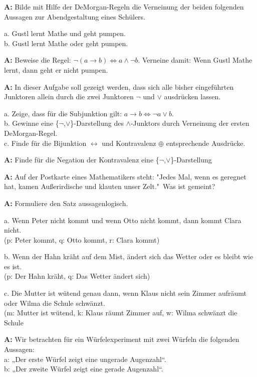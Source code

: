 \documentclass[landscape,twocolumn,a4paper]{article}
\begin{document}
\textbf{A:} 
Bilde mit Hilfe der DeMorgan-Regeln die Verneinung der beiden folgenden Aussagen zur Abendgestaltung eines Schülers. 

a. Gustl lernt Mathe und geht pumpen. \\
b. Gustl lernt Mathe oder geht pumpen.
\bigskip {}

\textbf{A:} 
Beweise die Regel: $\lnot (a \rightarrow b) \Leftrightarrow a \land \lnot b$. Verneine damit: Wenn Gustl Mathe lernt, dann geht er nicht pumpen.
\bigskip {}



\textbf{A:} 
In dieser Aufgabe soll gezeigt werden, dass sich alle bisher eingeführten Junktoren allein durch die zwei Junktoren
$\lnot$ und $\lor$ ausdrücken lassen.

a. Zeige, dass für die Subjunktion gilt: $a \rightarrow b \Leftrightarrow \lnot a \lor b$. \\
b. Gewinne eine  \{$\lnot$,$\lor$\}-Darstellung des $\land$-Junktors durch Verneinung der ersten DeMorgan-Regel. \\
c. Finde für die Bijunktion $\leftrightarrow$ und Kontravalenz $\oplus$ entsprechende Ausdrücke.
\bigskip {}

\textbf{A:} 
Finde für die Negation der Kontravalenz eine  \{$\lnot$,$\lor$\}-Darstellung
\bigskip {}

\textbf{A:} 
Auf der Postkarte eines Mathematikers steht: "Jedes Mal, wenn es geregnet hat, kamen Außerirdische und 
klauten unser Zelt."\,  Was ist gemeint?
\bigskip {}

\textbf{A:} 
Formuliere den Satz aussagenlogisch.

a. Wenn Peter nicht kommt und wenn Otto nicht kommt, dann kommt Clara nicht. \\
(p: Peter kommt, q: Otto kommt, r: Clara kommt) 

b. Wenn der Hahn kräht auf dem Mist, ändert sich das Wetter oder es bleibt wie es ist. \\
(p: Der Hahn kräht, q: Das Wetter ändert sich)

c. Die Mutter ist wütend genau dann, wenn Klaus nicht sein Zimmer aufräumt oder Wilma die Schule schwänzt. \\
(m: Mutter ist wütend, k: Klaus räumt Zimmer auf, w: Wilma schwänzt die Schule
\bigskip {}

\textbf{A:} 
Wir betrachten für ein Würfelexperiment mit zwei Würfeln die folgenden Aussagen: \\
a: „Der erste Würfel zeigt eine ungerade Augenzahl“. \\
b: „Der zweite Würfel zeigt eine gerade Augenzahl“.  \\
\end{document}
